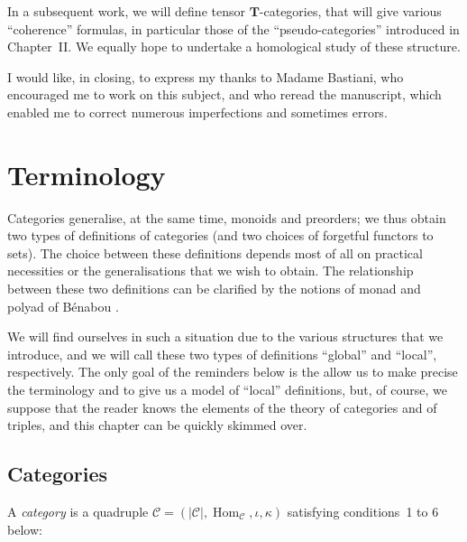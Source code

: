 \documentclass{article}
\newcommand{\oldpage}[1]{\marginpar{\footnotesize$\Big\vert$ \textit{p.~#1}}}
\newcommand{\cat}[1]{\mathcal{#1}}
\newcommand{\set}[1]{|#1|}
\newcommand{\TT}{\mathbf{T}}
\DeclareMathOperator{\Hom}{Hom}
\begin{document}
In a subsequent work, we will define tensor $\TT$-categories, that will give various ``coherence'' formulas, in particular those of the ``pseudo-categories'' introduced in Chapter~II.
We equally hope to undertake a homological study of these structure.

I would like, in closing, to express my thanks to Madame Bastiani, who encouraged me to work on this subject, and who reread the manuscript, which enabled me to correct numerous imperfections and sometimes errors.





\clearpage
\tableofcontents


\clearpage
\setcounter{section}{-1}
\section{Terminology}

\oldpage{219}

Categories generalise, at the same time, monoids and preorders;
we thus obtain two types of definitions of categories (and two choices of forgetful functors to sets).
The choice between these definitions depends most of all on practical necessities or the generalisations that we wish to obtain.
The relationship between these two definitions can be clarified by the notions of monad and polyad of Bénabou \cite{Be}.

We will find ourselves in such a situation due to the various structures that we introduce, and we will call these two types of definitions ``global'' and ``local'', respectively.
The only goal of the reminders below is the allow us to make precise the terminology and to give us a model of ``local'' definitions, but, of course, we suppose that the reader knows the elements of the theory of categories and of triples, and this chapter can be quickly skimmed over.


\subsection{Categories}

A \emph{category} is a quadruple $\cat{C}=(\set{\cat{C}}, \Hom_\cat{C}, \iota, \kappa)$ satisfying conditions~1 to 6 below:
\end{document}
